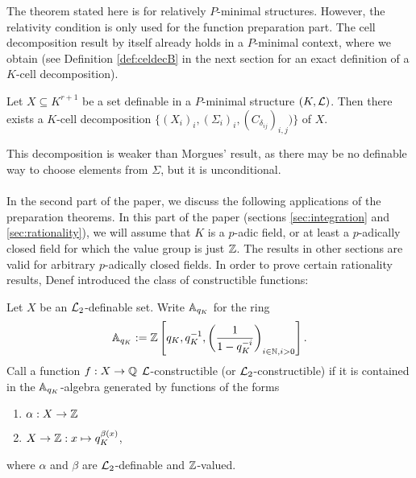 The theorem stated here is for relatively $P$-minimal structures. However, the relativity condition is only used for the function preparation part. 
The cell decomposition result by itself already holds in a $P$-minimal context, where we obtain (see Definition \ref{def:celdecB} in the next section for an exact definition of a $K$-cell decomposition).

\begin{thm}
Let $X \subseteq K^{r+1}$ be a set definable in a $P$-minimal structure $(K, \Lm)$. Then there exists a $K$-cell decomposition $\{(X_i)_{i},(\Sigma_i)_{i},(C_{\delta_{ij}})_{i,j})\}$ of $X$.
\end{thm}
 This decomposition is weaker than Morgues' result, as there may be no definable way to choose elements from $\Sigma$, but it is unconditional. 
\\\\
In the second part of the paper, we discuss the following applications of the preparation theorems.  In this part of the paper (sections \ref{sec:integration} and \ref{sec:rationality}), we will assume that $K$ is a $p$-adic field, or at least a $p$-adically closed field for which the value group is just $\Z$. The results in other sections are valid for arbitrary $p$-adically closed fields.
 In order to prove certain rationality results, Denef introduced the class of constructible functions: 

\begin{defn}
Let $X$ be an $\cL_2$-definable set. Write $\AA_{q_K}$ for the ring \[\AA_{q_K}:=\ZZ\left[q_K, q_K^{-1}, \left(\frac1{1-q_K^{-i}}\right)_{i\in \NN, i>0}\right].\]
Call a function $f:X\to \QQ$ $\cL$-constructible (or $\cL_2$-constructible) if it is contained in the $\AA_{q_K}$-algebra generated by functions of the forms
\begin{enumerate}
\item $\alpha:X\to \ZZ$
\item $X\to \ZZ:x\mapsto q_K^{\beta(x)}$,
\end{enumerate}
where $\alpha$ and $\beta$ are $\cL_2$-definable and $\ZZ$-valued.  
\end{defn}



